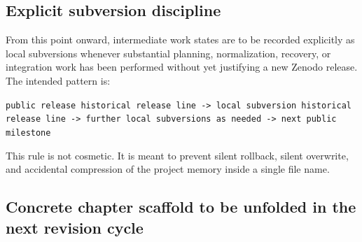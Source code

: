 \documentclass[12pt,a4paper]{article}
\DeclareRobustCommand{\QSCver}[1]{archival stage}
\renewcommand{\QSCver}[1]{historical release line}
\begin{document}
\subsection*{Explicit subversion discipline}

From this point onward, intermediate work states are to be recorded explicitly as local subversions whenever substantial planning, normalization, recovery, or integration work has been performed without yet justifying a new Zenodo release. The intended pattern is:
\begin{center}
\texttt{public release \QSCver{v2.27.0} -> local subversion \QSCver{v2.27.1} -> further local subversions as needed -> next public milestone}
\end{center}
This rule is not cosmetic. It is meant to prevent silent rollback, silent overwrite, and accidental compression of the project memory inside a single file name.


\subsection*{Concrete chapter scaffold to be unfolded in the next revision cycle}
\end{document}
